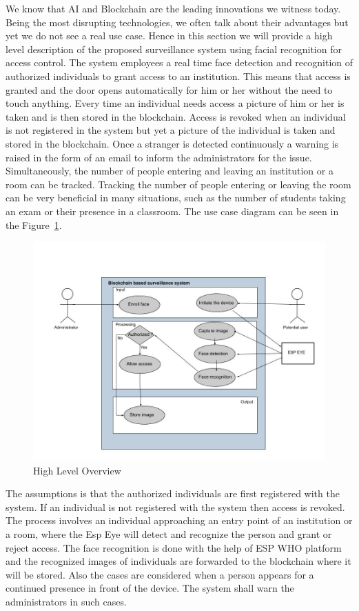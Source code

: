 We know that AI and Blockchain are the leading innovations we witness today. Being the most disrupting technologies, we often talk about their advantages but yet we do not see a real use case. Hence in this section we will provide a high level description of the proposed surveillance system using facial recognition for access control. The system employees a real time face detection and recognition of authorized individuals to grant access to an institution. This means that access is granted and the door opens automatically for him or her without the need to touch anything. Every time an individual needs access a picture of him or her is taken and is then stored in the blockchain. Access is revoked when an individual is not registered in the system but yet a picture of the individual is taken and stored in the blockchain. Once a stranger is detected continuously a warning is raised in the form of an email to inform the administrators for the issue. Simultaneously, the number of people entering and leaving an institution or a room can be tracked. Tracking the number of people entering or leaving the room can be very beneficial in many situations, such as the number of students taking an exam or their presence in a classroom. The use case diagram can be seen in the Figure~\ref{fig:use_case}. 

\begin{figure}[!htb]
    \centering
    \includegraphics[width=1\textwidth]{figures/use_case.jpg}
    \caption{High Level Overview}
    \label{fig:use_case}
\end{figure}


The assumptions is that the authorized individuals are first registered with the system. If an individual is not registered with the system then access is revoked. The process involves an individual approaching an entry point of an institution or a room, where the Esp Eye will detect and recognize the person and grant or reject access. The face recognition is done with the help of ESP WHO \cite{espwho} platform and the recognized images of individuals are forwarded to the blockchain where it will be stored. Also the cases are considered when a person appears for a continued presence in front of the device. The system shall warn the administrators in such cases.






